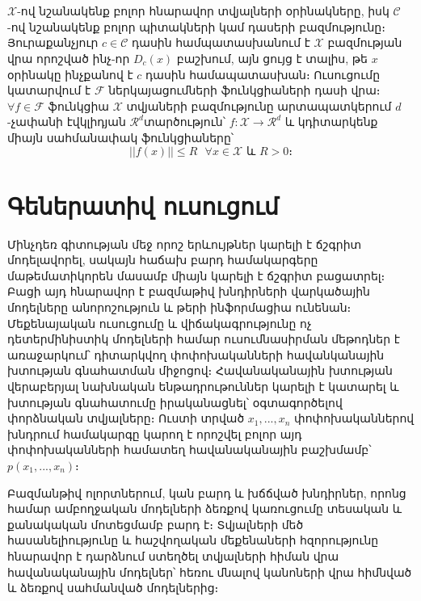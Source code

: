 \documentclass[11pt]{article}
\begin{document}
\section*{\hfill 
 \hfill} \noindent
{}
{}
 
 $\mathcal{X}$-ով նշանակենք բոլոր հնարավոր տվյալների օրինակները, իսկ $\mathcal{C}$-ով նշանակենք բոլոր պիտակների կամ դասերի բազմությունը։ Յուրաքանչյուր $c \in \mathcal{C}$ դասին համպատասխանում է $\mathcal{X}$ բազմության վրա որոշված ինչ-որ $D_c(x)$ բաշխում, այն ցույց է տալիս, թե $x$ օրինակը ինչքանով է $c$ դասին համապատասխան։ Ուսուցումը կատարվում է $\mathcal{F}$ ներկայացումների ֆունկցիաների դասի վրա։ $\forall f \in \mathcal{F}$  ֆունկցիա $\mathcal{X}$ տվյաների բազմությունը արտապատկերում $d$-չափանի էվկլիդյան $\mathcal{R}^d$տարծություն՝ $f:\mathcal{X}\rightarrow\mathcal{R}^d$  և կդիտարկենք միայն սահմանափակ ֆունկցիաները՝
 $$||f(x)|| \leq R \text{    } \forall x \in \mathcal{X} \text{ և } R > 0։$$ 
\iffalse
\section*{\hfill Գեներատիվ ուսուցում \hfill} \noindent

{}


\par Մինչդեռ գիտության մեջ որոշ երևույթներ կարելի է ճշգրիտ մոդելավորել, սակայն հաճախ բարդ համակարգերը մաթեմատիկորեն մասամբ միայն կարելի է ճշգրիտ բացատրել։ Բացի այդ հնարավոր է բազմաթիվ խնդիրների վարկածային մոդելները անորոշություն և թերի ինֆորմացիա ունենան։ Մեքենայական ուսուցումը և վիճակագրությունը ոչ դետերմինիստիկ մոդելների համար ուսումնասիրման մեթոդներ է առաջարկում՝  դիտարկվող փոփոխականների հավանկանային խտության գնահատման միջոցով։ Հավանականային խտության վերաբերյալ նախնական ենթադրութուններ կարելի է կատարել և խտության գնահատումը իրականացնել՝ օգտագործելով փորձնական տվյալները։ Ուստի տրված $x_1, ..., x_n$ փոփոխականներով խնդրում համակարգը կարող է որոշվել բոլոր այդ փոփոխականների համատեղ հավանականային բաշխմամբ՝ $p  \left ( x_1, ..., x_n \right )$։
\par Բազմանթիվ ոլորտներում, կան բարդ և խճճված խնդիրներ, որոնց համար ամբողջական մոդելների ձեռքով կառուցումը  տեսական և քանակական մոտեցմամբ  բարդ է։ Տվյալների մեծ հասանելիությունը և հաշվողական մեքենաների հզորությունը հնարավոր է դարձնում ստեղծել տվյալների հիման վրա հավանականային մոդելներ՝ հեռու մնալով կանոների վրա հիմնված և ձեռքով սահմանված մոդելներից։ 
\end{document}
